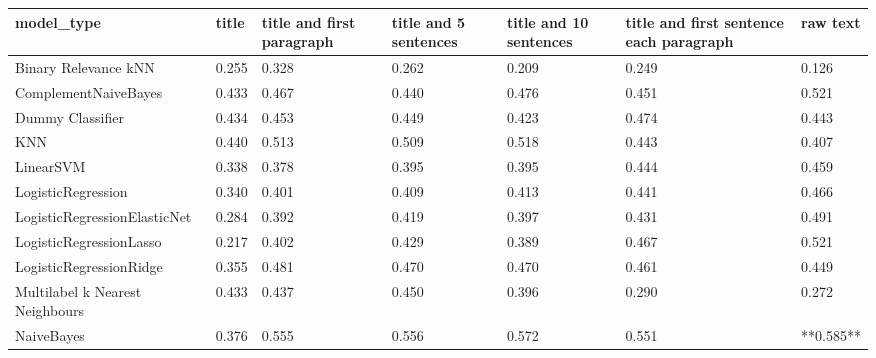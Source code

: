 \begin{tabular}{lllllll}
\toprule
                     model\_type & title & title and first paragraph & title and 5 sentences & title and 10 sentences & title and first sentence each paragraph &  raw text \\
\midrule
           Binary Relevance kNN & 0.255 &                     0.328 &                 0.262 &                  0.209 &                                   0.249 &     0.126 \\
           ComplementNaiveBayes & 0.433 &                     0.467 &                 0.440 &                  0.476 &                                   0.451 &     0.521 \\
               Dummy Classifier & 0.434 &                     0.453 &                 0.449 &                  0.423 &                                   0.474 &     0.443 \\
                            KNN & 0.440 &                     0.513 &                 0.509 &                  0.518 &                                   0.443 &     0.407 \\
                      LinearSVM & 0.338 &                     0.378 &                 0.395 &                  0.395 &                                   0.444 &     0.459 \\
             LogisticRegression & 0.340 &                     0.401 &                 0.409 &                  0.413 &                                   0.441 &     0.466 \\
   LogisticRegressionElasticNet & 0.284 &                     0.392 &                 0.419 &                  0.397 &                                   0.431 &     0.491 \\
        LogisticRegressionLasso & 0.217 &                     0.402 &                 0.429 &                  0.389 &                                   0.467 &     0.521 \\
        LogisticRegressionRidge & 0.355 &                     0.481 &                 0.470 &                  0.470 &                                   0.461 &     0.449 \\
Multilabel k Nearest Neighbours & 0.433 &                     0.437 &                 0.450 &                  0.396 &                                   0.290 &     0.272 \\
                     NaiveBayes & 0.376 &                     0.555 &                 0.556 &                  0.572 &                                   0.551 & **0.585** \\

\end{tabular}
